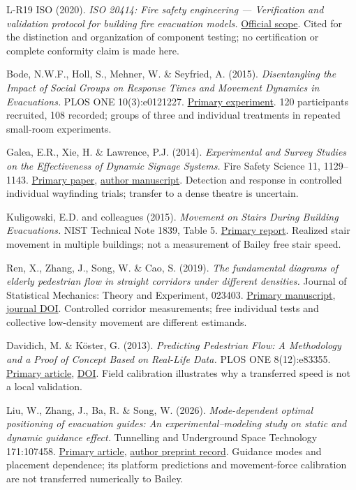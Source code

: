 \documentclass[11pt,a4paper]{article}
\begin{document}
\begin{thebibliography}{L-R19}
 ISO (2020). \emph{ISO 20414: Fire safety engineering — Verification and validation protocol for building fire evacuation models.} \href{https://www.iso.org/standard/78348.html}{Official scope}. Cited for the distinction and organization of component testing; no certification or complete conformity claim is made here.

 Bode, N.W.F., Holl, S., Mehner, W. \& Seyfried, A. (2015). \emph{Disentangling the Impact of Social Groups on Response Times and Movement Dynamics in Evacuations.} PLOS ONE 10(3):e0121227. \href{https://doi.org/10.1371/journal.pone.0121227}{Primary experiment}. 120 participants recruited, 108 recorded; groups of three and individual treatments in repeated small-room experiments.

 Galea, E.R., Xie, H. \& Lawrence, P.J. (2014). \emph{Experimental and Survey Studies on the Effectiveness of Dynamic Signage Systems.} Fire Safety Science 11, 1129–1143. \href{https://doi.org/10.3801/IAFSS.FSS.11-1129}{Primary paper}, \href{https://gala.gre.ac.uk/id/eprint/14393/1/14393_GALEA_Dynamic_Signage_Systems_2014.pdf}{author manuscript}. Detection and response in controlled individual wayfinding trials; transfer to a dense theatre is uncertain.

 Kuligowski, E.D. and colleagues (2015). \emph{Movement on Stairs During Building Evacuations.} NIST Technical Note 1839, Table 5. \href{https://doi.org/10.6028/NIST.TN.1839}{Primary report}. Realized stair movement in multiple buildings; not a measurement of Bailey free stair speed.

 Ren, X., Zhang, J., Song, W. \& Cao, S. (2019). \emph{The fundamental diagrams of elderly pedestrian flow in straight corridors under different densities.} Journal of Statistical Mechanics: Theory and Experiment, 023403. \href{https://arxiv.org/abs/1811.10883}{Primary manuscript}, \href{https://doi.org/10.1088/1742-5468/aafa7b}{journal DOI}. Controlled corridor measurements; free individual tests and collective low-density movement are different estimands.

 Davidich, M. \& Köster, G. (2013). \emph{Predicting Pedestrian Flow: A Methodology and a Proof of Concept Based on Real-Life Data.} PLOS ONE 8(12):e83355. \href{https://pmc.ncbi.nlm.nih.gov/articles/PMC3873946/}{Primary article}, \href{https://doi.org/10.1371/journal.pone.0083355}{DOI}. Field calibration illustrates why a transferred speed is not a local validation.

 Liu, W., Zhang, J., Ba, R. \& Song, W. (2026). \emph{Mode-dependent optimal positioning of evacuation guides: An experimental–modeling study on static and dynamic guidance effect.} Tunnelling and Underground Space Technology 171:107458. \href{https://doi.org/10.1016/j.tust.2026.107458}{Primary article}, \href{https://papers.ssrn.com/sol3/papers.cfm?abstract_id=5532949}{author preprint record}. Guidance modes and placement dependence; its platform predictions and movement-force calibration are not transferred numerically to Bailey.
\end{thebibliography}
\end{document}
